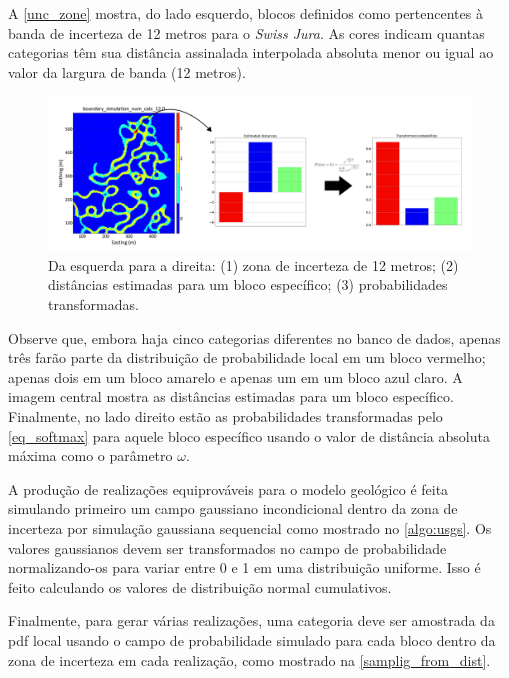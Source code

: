 A \autoref{unc_zone} mostra, do lado esquerdo, blocos definidos como pertencentes à banda de incerteza de 12 metros para o \textit{Swiss Jura}. As cores indicam quantas categorias têm sua distância assinalada interpolada absoluta menor ou igual ao valor da largura de banda (12 metros).

\begin{figure}[H]
	\caption{\label{unc_zone} Da esquerda para a direita: (1) zona de incerteza de 12 metros; (2) distâncias estimadas para um bloco específico; (3) probabilidades transformadas.}
	\centering
		\includegraphics[width=\textwidth]{capitulo_3/imagens/trans_dist_prob.png}
\end{figure}

Observe que, embora haja cinco categorias diferentes no banco de dados, apenas três farão parte da distribuição de probabilidade local em um bloco vermelho; apenas dois em um bloco amarelo e apenas um em um bloco azul claro. A imagem central mostra as distâncias estimadas para um bloco específico. Finalmente, no lado direito estão as probabilidades transformadas pelo \autoref{eq_softmax} para aquele bloco específico usando o valor de distância absoluta máxima como o parâmetro $\omega$.

A produção de realizações equiprováveis para o modelo geológico é feita simulando primeiro um campo gaussiano incondicional dentro da zona de incerteza por simulação gaussiana sequencial como mostrado no \autoref{algo:usgs}. Os valores gaussianos devem ser transformados no campo de probabilidade normalizando-os para variar entre 0 e 1 em uma distribuição uniforme. Isso é feito calculando os valores de distribuição normal cumulativos.

Finalmente, para gerar várias realizações, uma categoria deve ser amostrada da pdf local usando o campo de probabilidade simulado para cada bloco dentro da zona de incerteza em cada realização, como mostrado na \autoref{samplig_from_dist}.

